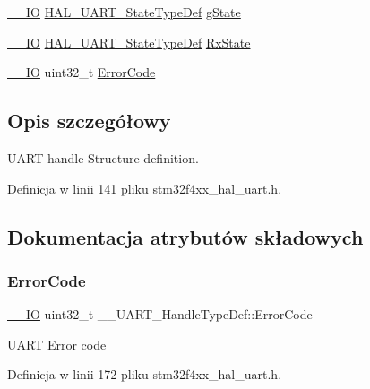 \begin{DoxyCompactItemize}
\hyperlink{core__sc300_8h_aec43007d9998a0a0e01faede4133d6be}{\+\_\+\+\_\+\+IO} \hyperlink{group___u_a_r_t___exported___types_gaf55d844a35379c204c90be5d1e8e50ba}{H\+A\+L\+\_\+\+U\+A\+R\+T\+\_\+\+State\+Type\+Def} \hyperlink{struct_____u_a_r_t___handle_type_def_a0c4242c009d8754417dfd87a5ab6cb10}{g\+State}
\item 
\hyperlink{core__sc300_8h_aec43007d9998a0a0e01faede4133d6be}{\+\_\+\+\_\+\+IO} \hyperlink{group___u_a_r_t___exported___types_gaf55d844a35379c204c90be5d1e8e50ba}{H\+A\+L\+\_\+\+U\+A\+R\+T\+\_\+\+State\+Type\+Def} \hyperlink{struct_____u_a_r_t___handle_type_def_a1b5639a73b305432afeb6aa18506d0fb}{Rx\+State}
\item 
\hyperlink{core__sc300_8h_aec43007d9998a0a0e01faede4133d6be}{\+\_\+\+\_\+\+IO} uint32\+\_\+t \hyperlink{struct_____u_a_r_t___handle_type_def_a0447bf9458caff1ad44ee7e947b1413f}{Error\+Code}
\end{DoxyCompactItemize}


\subsection{Opis szczegółowy}
U\+A\+RT handle Structure definition. 

Definicja w linii 141 pliku stm32f4xx\+\_\+hal\+\_\+uart.\+h.



\subsection{Dokumentacja atrybutów składowych}
\mbox{\label{struct_____u_a_r_t___handle_type_def_a0447bf9458caff1ad44ee7e947b1413f}} 
\subsubsection{\texorpdfstring{Error\+Code}{ErrorCode}}
{\footnotesize\ttfamily \hyperlink{core__sc300_8h_aec43007d9998a0a0e01faede4133d6be}{\+\_\+\+\_\+\+IO} uint32\+\_\+t \+\_\+\+\_\+\+U\+A\+R\+T\+\_\+\+Handle\+Type\+Def\+::\+Error\+Code}

U\+A\+RT Error code 

Definicja w linii 172 pliku stm32f4xx\+\_\+hal\+\_\+uart.\+h.

